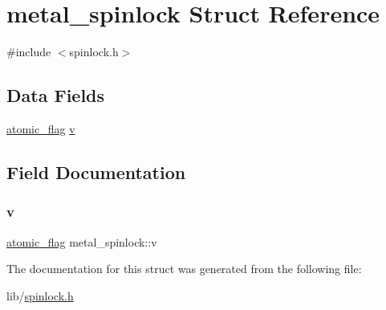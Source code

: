 \hypertarget{structmetal__spinlock}{}\section{metal\+\_\+spinlock Struct Reference}
\label{structmetal__spinlock}


{\ttfamily \#include $<$spinlock.\+h$>$}

\subsection*{Data Fields}
\begin{DoxyCompactItemize}
\item 
\hyperlink{compiler_2gcc_2atomic_8h_a9530e5944c0b8576ad6b94fc24467230}{atomic\+\_\+flag} \hyperlink{structmetal__spinlock_ae3695afc6004a2d35e2965fc634307a9}{v}
\end{DoxyCompactItemize}


\subsection{Field Documentation}
\mbox{\label{structmetal__spinlock_ae3695afc6004a2d35e2965fc634307a9}} 
\subsubsection{\texorpdfstring{v}{v}}
{\footnotesize\ttfamily \hyperlink{compiler_2gcc_2atomic_8h_a9530e5944c0b8576ad6b94fc24467230}{atomic\+\_\+flag} metal\+\_\+spinlock\+::v}



The documentation for this struct was generated from the following file\+:\begin{DoxyCompactItemize}
\item 
lib/\hyperlink{spinlock_8h}{spinlock.\+h}\end{DoxyCompactItemize}
